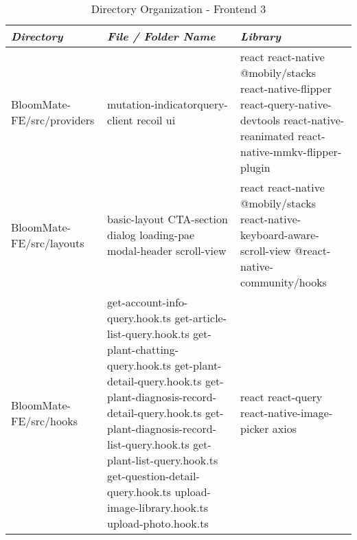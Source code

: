 \documentclass[conference, a4paper]{IEEEtran}
\begin{document}
\begin{table} [htp]
    \caption{Directory Organization - Frontend 3}
    \centering
    \renewcommand{\arraystretch}{1.3}
    \begin{tabular}{p{1.7cm}|p{2.8cm}|p{2.5cm}}
    \hline
    \textit{\textbf{Directory}} & \textit{\textbf{File / Folder Name}} & \textit{\textbf{Library}} \\
    
\hline
 BloomMate-FE\newline/src/providers & mutation-indicator\newline query-client \newline recoil \newline ui  & react  \newline  react-native \newline  @mobily/stacks \newline  react-native-flipper \newline  react-query-native-devtools \newline  react-native-reanimated \newline  react-native-mmkv-flipper-plugin \\
 \hline
 BloomMate-FE\newline/src/layouts & basic-layout \newline CTA-section \newline dialog \newline loading-pae
 \newline modal-header \newline scroll-view & react \newline react-native \newline @mobily/stacks \newline react-native-keyboard-aware-scroll-view \newline @react-native-community/hooks \\
 \hline
  BloomMate-FE\newline/src/hooks & get-account-info-query.hook.ts  \newline  get-article-list-query.hook.ts
 \newline get-plant-chatting-query.hook.ts \newline get-plant-detail-query.hook.ts \newline get-plant-diagnosis-record-detail-query.hook.ts \newline get-plant-diagnosis-record-list-query.hook.ts \newline get-plant-list-query.hook.ts \newline get-question-detail-query.hook.ts \newline upload-image-library.hook.ts \newline upload-photo.hook.ts & react \newline react-query \newline react-native-image-picker \newline axios \\ 
 \hline
    \end{tabular}
\end{table}
\end{document}
